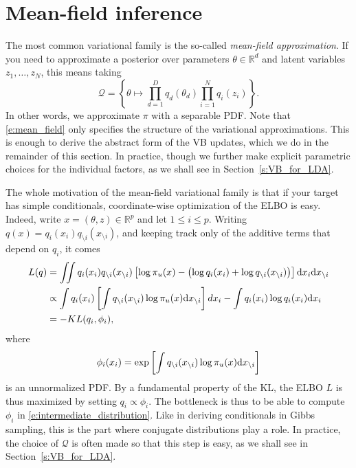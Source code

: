 \section{Mean-field inference}
The most common variational family is the so-called \emph{mean-field approximation}.
If you need to approximate a posterior over parameters $\theta\in\mathbb{R}^d$ and latent variables $z_1,\dots,z_N$, this means taking
\begin{equation}
  \label{e:mean_field}
  \mathcal Q = \left\{\theta\mapsto \prod_{d=1}^D q_d(\theta_d) \prod_{i=1}^N q_i(z_i)\right\}.
\end{equation}
In other words, we approximate $\pi$ with a separable PDF.
Note that \eqref{e:mean_field} only specifies the structure of the variational approximations.
This is enough to derive the abstract form of the VB updates, which we do in the remainder of this section.
In practice, though we further make explicit parametric choices for the individual factors, as we shall see in Section~\ref{s:VB_for_LDA}.

The whole motivation of the mean-field variational family is that if your target has simple conditionals, coordinate-wise optimization of the ELBO is easy.
Indeed, write $x=(\theta,z) \in \mathbb{R}^p$ and let $1\leq i\leq p$. Writing $q(x) = q_i(x_i)q_{\setminus i}(x_{\setminus i})$, and keeping track only of the additive terms that depend on $q_i$, it comes
\begin{align*}
L(q)
&= \iint  q_i(x_i)q_{\setminus i}(x_{\setminus i}) \left[\log \pi_u(x) - \left( \log q_i(x_i) + \log q_{\setminus i}(x_{\setminus i}) \right)\right] \mathrm{d} x_i \mathrm{d} x_{\setminus i}\\
&\propto \int q_i(x_i) \left[ \int q_{\setminus i}(x_{\setminus i}) \log \pi_u(x) \mathrm{d} x_{\setminus i}\right] d x_i- \int q_i(x_i)\log q_i(x_i) \mathrm{d} x_i\\
&= - KL(q_i,\phi_i),
\end{align*}
where
\begin{equation}
  \label{e:intermediate_distribution}
  \phi_i(x_i) = \exp \left[\int q_{\setminus i}(x_{\setminus i}) \log \pi_u(x) \mathrm{d} x_{\setminus i}\right]
\end{equation}
is an unnormalized PDF. By a fundamental property of the KL, the ELBO $L$ is thus maximized by setting $q_i\propto \phi_i$.
The bottleneck is thus to be able to compute $\phi_i$ in \eqref{e:intermediate_distribution}.
Like in deriving conditionals in Gibbs sampling, this is the part where conjugate distributions play a role.
In practice, the choice of $\mathcal Q$ is often made so that this step is easy, as we shall see in Section~\ref{s:VB_for_LDA}.

